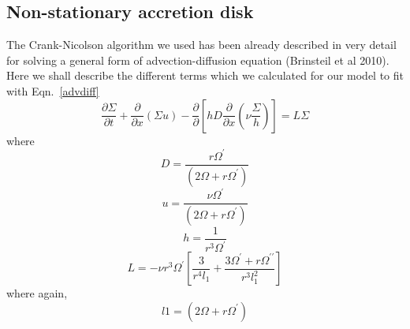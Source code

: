\documentclass[useAMS,usenatbib]{mn2e}
\begin{document}
\subsection{Non-stationary accretion disk}
The Crank-Nicolson algorithm we used has been already described in very detail for solving a general form of advection-diffusion equation (Brinsteil et al 2010). Here we shall describe the different terms which we calculated for our model to fit with Eqn.~\ref{advdiff}  
\begin{equation}
\frac{\partial\Sigma}{\partial t} + \frac{\partial}{\partial x}(\Sigma u) - \frac{\partial}{\partial}\left[h D\frac{\partial}{\partial x}\left(\nu\frac{\Sigma}{h}\right)\right] = L\Sigma
\label{advdiff}
\end{equation}
where
\begin{equation}
D = \frac{r\Omega^\prime}{\left(2\Omega + r\Omega^\prime\right)}
\end{equation}
\begin{equation}
u = \frac{\nu\Omega^\prime}{\left(2\Omega + r\Omega^\prime\right)}
\end{equation}
\begin{equation}
h = \frac{1}{r^3\Omega^\prime}
\end{equation}
\begin{equation}
L = -\nu r^3\Omega^\prime\left[\frac{3}{r^4 l_1} +\frac{3\Omega^\prime + r\Omega^{\prime\prime}}{r^3l_1^2}\right]
\end{equation}
where again,
\begin{equation}
l1 = (2\Omega + r\Omega^\prime)
\end{equation}
\label{lastpage}
\end{document}
